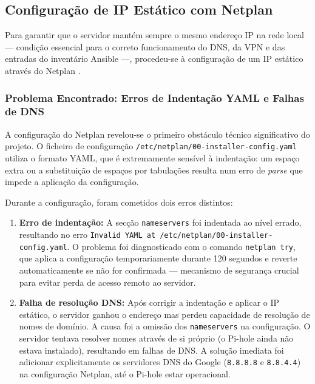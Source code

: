 \subsection{Configuração de IP Estático com Netplan}
\label{sec:netplan}
 
Para garantir que o servidor mantém sempre o mesmo endereço IP na rede local --- condição essencial para o correto funcionamento do DNS, da VPN e das entradas do inventário Ansible ---, procedeu-se à configuração de um IP estático através do Netplan \cite{netplan_docs}.
 
\subsubsection*{Problema Encontrado: Erros de Indentação YAML e Falhas de DNS}
 
A configuração do Netplan revelou-se o primeiro obstáculo técnico significativo do projeto. O ficheiro de configuração \texttt{/etc/netplan/00-installer-config.yaml} utiliza o formato YAML, que é extremamente sensível à indentação: um espaço extra ou a substituição de espaços por tabulações resulta num erro de \textit{parse} que impede a aplicação da configuração.
 
Durante a configuração, foram cometidos dois erros distintos:
 
\begin{enumerate}
    \item \textbf{Erro de indentação:} A secção \texttt{nameservers} foi indentada ao nível errado, resultando no erro \texttt{Invalid YAML at /etc/netplan/00-installer-config.yaml}. O problema foi diagnosticado com o comando \texttt{netplan try}, que aplica a configuração temporariamente durante 120 segundos e reverte automaticamente se não for confirmada --- mecanismo de segurança crucial para evitar perda de acesso remoto ao servidor.
 
    \item \textbf{Falha de resolução DNS:} Após corrigir a indentação e aplicar o IP estático, o servidor ganhou o endereço mas perdeu capacidade de resolução de nomes de domínio. A causa foi a omissão dos \texttt{nameservers} na configuração. O servidor tentava resolver nomes através de si próprio (o Pi-hole ainda não estava instalado), resultando em falhas de DNS. A solução imediata foi adicionar explicitamente os servidores DNS do Google (\texttt{8.8.8.8} e \texttt{8.8.4.4}) na configuração Netplan, até o Pi-hole estar operacional.
\end{enumerate}
 
